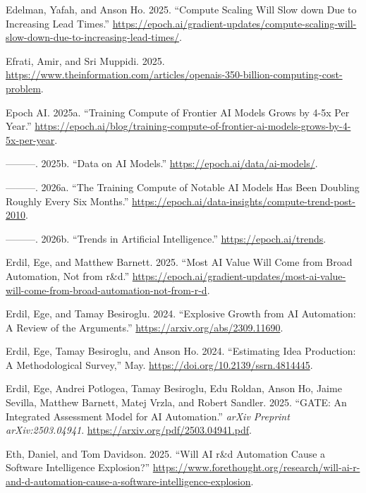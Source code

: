 \documentclass[
  11pt,
  letterpaper,
  DIV=11,
  numbers=noendperiod]{scrartcl}
\newlength{\cslhangindent}
\newenvironment{CSLReferences}[2] %
 {\begin{list}{}{%
  \setlength{\itemindent}{0pt}
  \setlength{\leftmargin}{0pt}
  \setlength{\parsep}{0pt}
  \ifodd #1
   \setlength{\leftmargin}{\cslhangindent}
   \setlength{\itemindent}{-1\cslhangindent}
  \fi
  \setlength{\itemsep}{#2\baselineskip}}}
 {\end{list}}
\begin{document}
\begin{CSLReferences}{1}{0}
Edelman, Yafah, and Anson Ho. 2025. {``Compute Scaling Will Slow down
Due to Increasing Lead Times.''}
\url{https://epoch.ai/gradient-updates/compute-scaling-will-slow-down-due-to-increasing-lead-times/}.

Efrati, Amir, and Sri Muppidi. 2025.
\url{https://www.theinformation.com/articles/openais-350-billion-computing-cost-problem}.

Epoch AI. 2025a. {``Training Compute of Frontier AI Models Grows by 4-5x
Per Year.''}
\url{https://epoch.ai/blog/training-compute-of-frontier-ai-models-grows-by-4-5x-per-year}.

---------. 2025b. {``Data on AI Models.''}
\url{https://epoch.ai/data/ai-models/}.

---------. 2026a. {``The Training Compute of Notable AI Models Has Been
Doubling Roughly Every Six Months.''}
\url{https://epoch.ai/data-insights/compute-trend-post-2010}.

---------. 2026b. {``Trends in Artificial Intelligence.''}
\url{https://epoch.ai/trends}.

Erdil, Ege, and Matthew Barnett. 2025. {``Most AI Value Will Come from
Broad Automation, Not from r\&d.''}
\url{https://epoch.ai/gradient-updates/most-ai-value-will-come-from-broad-automation-not-from-r-d}.

Erdil, Ege, and Tamay Besiroglu. 2024. {``Explosive Growth from AI
Automation: A Review of the Arguments.''}
\url{https://arxiv.org/abs/2309.11690}.

Erdil, Ege, Tamay Besiroglu, and Anson Ho. 2024. {``Estimating Idea
Production: A Methodological Survey,''} May.
\url{https://doi.org/10.2139/ssrn.4814445}.

Erdil, Ege, Andrei Potlogea, Tamay Besiroglu, Edu Roldan, Anson Ho,
Jaime Sevilla, Matthew Barnett, Matej Vrzla, and Robert Sandler. 2025.
{``GATE: An Integrated Assessment Model for AI Automation.''}
\emph{arXiv Preprint arXiv:2503.04941}.
\url{https://arxiv.org/pdf/2503.04941.pdf}.

Eth, Daniel, and Tom Davidson. 2025. {``Will AI r\&d Automation Cause a
Software Intelligence Explosion?''}
\url{https://www.forethought.org/research/will-ai-r-and-d-automation-cause-a-software-intelligence-explosion}.


\end{CSLReferences}
\end{document}
